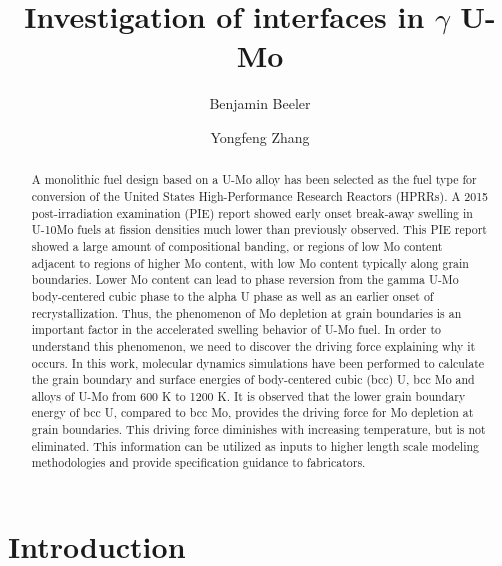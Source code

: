 \documentclass[review]{elsarticle}
\begin{document}
\begin{frontmatter}
\title{Investigation of interfaces in $\gamma$ U-Mo}

\author[inl]{Benjamin Beeler}
\author[inl]{Yongfeng Zhang}
\address[inl]{Idaho National Laboratory, Idaho Falls, ID 83415}


\begin{abstract}
A monolithic fuel design based on a U-Mo alloy has been selected as the fuel type for conversion of the United States High-Performance Research Reactors (HPRRs). A 2015 post-irradiation examination (PIE) report showed early onset break-away swelling in U-10Mo fuels at fission densities much lower than previously observed. This PIE report showed a large amount of compositional banding, or regions of low Mo content adjacent to regions of higher Mo content, with low Mo content typically along grain boundaries. Lower Mo content can lead to phase reversion from the gamma U-Mo body-centered cubic phase to the alpha U phase as well as an earlier onset of recrystallization. Thus, the phenomenon of Mo depletion at grain boundaries is an important factor in the accelerated swelling behavior of U-Mo fuel. In order to understand this phenomenon, we need to discover the driving force explaining why it occurs. In this work, molecular dynamics simulations have been performed to calculate the grain boundary and surface energies of body-centered cubic (bcc) U, bcc Mo and alloys of U-Mo from 600 K to 1200 K. It is observed that the lower grain boundary energy of bcc U, compared to bcc Mo, provides the driving force for Mo depletion at grain boundaries. This driving force diminishes with increasing temperature, but is not eliminated. This information can be utilized as inputs to higher length scale modeling methodologies and provide specification guidance to fabricators.
\end{abstract}
\end{frontmatter}

\linenumbers
\modulolinenumbers[5]

\section{Introduction}
\end{document}
